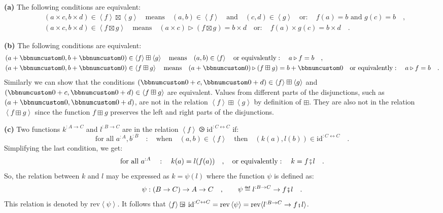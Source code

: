 \textbf{(a)} The following conditions are equivalent:
\begin{align*}
 & (a\times c,b\times d)\in\left<f\right>\boxtimes\left<g\right>\quad\text{means}\quad(a,b)\in\left<f\right>\quad\text{and}\quad(c,d)\in\left<g\right>\quad\text{or}:\quad f(a)=b\text{ and }g(c)=b\quad,\\
 & (a\times c,b\times d)\in\left<f\boxtimes g\right>\quad\text{means}\quad(a\times c)\triangleright(f\boxtimes g)=b\times d\quad\text{or}:\quad f(a)\times g(c)=b\times d\quad.
\end{align*}

\textbf{(b)} The following conditions are equivalent:
\begin{align*}
 & (a+\bbnum 0,b+\bbnum 0)\in\left<f\right>\boxplus\left<g\right>\quad\text{means}\quad(a,b)\in\left<f\right>\quad\text{or equivalently}:\quad a\triangleright f=b\quad,\\
 & (a+\bbnum 0,b+\bbnum 0)\in\left<f\boxplus g\right>\quad\text{means}\quad(a+\bbnum 0)\triangleright(f\boxplus g)=b+\bbnum 0\quad\text{or equivalently}:\quad a\triangleright f=b\quad.
\end{align*}
Similarly we can show that the conditions $(\bbnum 0+c,\bbnum 0+d)\in\left<f\right>\boxplus\left<g\right>$
and $(\bbnum 0+c,\bbnum 0+d)\in\left<f\boxplus g\right>$ are equivalent.
Values from different parts of the disjunctions, such as $(a+\bbnum 0,\bbnum 0+d)$,
are not in the relation $\left<f\right>\boxplus\left<g\right>$ by
definition of $\boxplus$. They are also not in the relation $\left<f\boxplus g\right>$
since the function $f\boxplus g$ preserves the left and right parts
of the disjunctions.

\textbf{(c)} Two functions $k^{:A\rightarrow C}$ and $l^{:B\rightarrow C}$
are in the relation $\left<f\right>\ogreaterthan\text{id}^{:C\leftrightarrow C}$
if:
\[
\text{for all }a^{:A},b^{:B}\quad:\quad\text{when}\quad(a,b)\in\left<f\right>\quad\text{then}\quad(k(a),l(b))\in\text{id}^{:C\leftrightarrow C}\quad.
\]
Simplifying the last condition, we get:
\[
\text{for all }a^{:A}\quad:\quad k(a)=l(f(a))\quad,\quad\text{or equivalently}:\quad k=f\bef l\quad.
\]
So, the relation between $k$ and $l$ may be expressed as $k=\psi(l)$
where the function $\psi$ is defined as:
\[
\psi:\left(B\rightarrow C\right)\rightarrow A\rightarrow C\quad,\quad\quad\psi\triangleq l^{:B\rightarrow C}\rightarrow f\bef l\quad.
\]
This relation is denoted by $\text{rev}\left<\psi\right>$. It follows
that $\left<f\right>\ogreaterthan\text{id}^{:C\leftrightarrow C}=\text{rev}\left<\psi\right>=\text{rev}\langle l^{:B\rightarrow C}\rightarrow f\bef l\rangle$.

